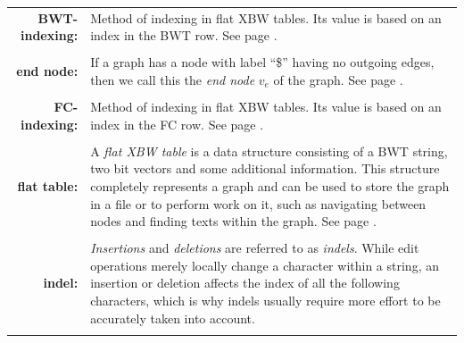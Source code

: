\documentclass[a4paper,12pt,twoside,BCOR=10mm]{scrbook}
\begin{document}
\begin{tabular}{r p{12cm}}
\textbf{BWT-indexing:} & Method of indexing in flat XBW tables.
Its value is based on an index in the BWT row.
See page \pageref{def:bwt_indexing}.
\\ \\

\textbf{end node:} & If a graph has a node with label “\$”
having no outgoing edges, then we call this the \textit{end node} $ v_e $ of the graph.
See page \pageref{def:end_node}.
\\ \\

\textbf{FC-indexing:} & Method of indexing in flat XBW tables.
Its value is based on an index in the FC row.
See page \pageref{def:fc_indexing}.
\\ \\

\textbf{flat table:} & A \textit{flat XBW table} is a data structure consisting of a BWT string,
two bit vectors and some additional information. This structure completely represents a graph
and can be used to store the graph in a file or to perform work on it, such as navigating between
nodes and finding texts within the graph.
See page \pageref{def:flat_table}.
\\ \\

\textbf{indel:} &
\textit{Insertions} and \textit{deletions} are referred to as \textit{indels}. While
edit operations merely locally change a character within a string, an insertion or
deletion affects the index of all the following characters, which is why indels
usually require more effort to be accurately taken into account.
\\ \\

\end{tabular}
\end{document}
